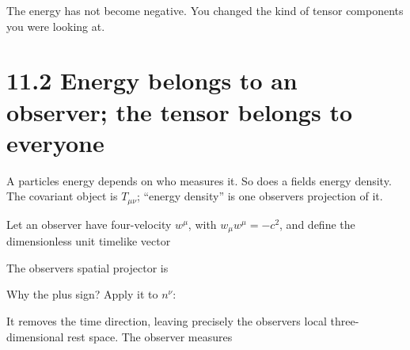 \documentclass[
  11pt,
  letterpaper,
  oneside,
  openany]{scrbook}
\begin{document}
The energy has not become negative. You changed the kind of tensor
components you were looking at.

\hypertarget{energy-belongs-to-an-observer-the-tensor-belongs-to-everyone}{%
\section{11.2 Energy belongs to an observer; the tensor belongs to
everyone}\label{energy-belongs-to-an-observer-the-tensor-belongs-to-everyone}}

A particle\textquotesingle s energy depends on who measures it. So does
a field\textquotesingle s energy density. The covariant object is
\(T_{\mu\nu}\); ``energy density'' is one observer\textquotesingle s
projection of it.

Let an observer have four-velocity \(w^\mu\), with \(w_\mu w^\mu=-c^2\),
and define the dimensionless unit timelike vector

\begin{center}
\begingroup
{}
\ifdim\wd\grmathbox>\linewidth
\resizebox{\linewidth}{!}{\usebox{\grmathbox}}
\else\usebox{\grmathbox}\fi
\endgroup
\end{center}

The observer\textquotesingle s spatial projector is

\begin{center}
\begingroup
{}
\ifdim\wd\grmathbox>\linewidth
\resizebox{\linewidth}{!}{\usebox{\grmathbox}}
\else\usebox{\grmathbox}\fi
\endgroup
\end{center}

Why the plus sign? Apply it to \(n^\nu\):

\begin{center}
\begingroup
{}
\ifdim\wd\grmathbox>\linewidth
\resizebox{\linewidth}{!}{\usebox{\grmathbox}}
\else\usebox{\grmathbox}\fi
\endgroup
\end{center}

It removes the time direction, leaving precisely the
observer\textquotesingle s local three-dimensional rest space. The
observer measures

\begin{center}
\begingroup
{}
\ifdim\wd\grmathbox>\linewidth
\resizebox{\linewidth}{!}{\usebox{\grmathbox}}
\else\usebox{\grmathbox}\fi
\endgroup
\end{center}
\end{document}
